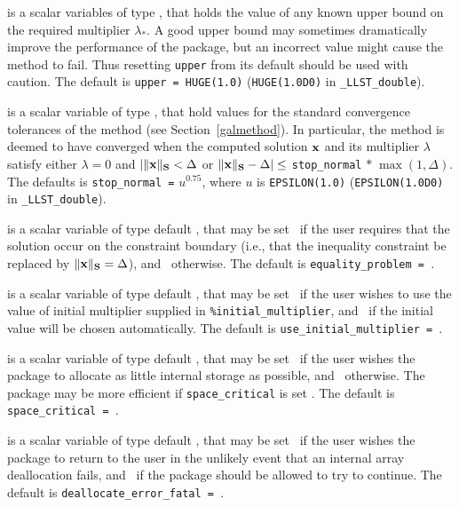 \documentclass{galahad}
\newcommand{\packagename}{LLST}
\newcommand{\fullpackagename}{\libraryname\_\packagename}
\begin{document}
\begin{description}
 is a scalar variables of type \realdp, that holds the value
of any known upper bound on the required multiplier $\lambda_*$. A good upper
bound may sometimes dramatically improve the performance of the package, but
an incorrect value might cause the method to fail. Thus resetting
{\tt upper} from its default should be used with caution. 
The default is {\tt upper = HUGE(1.0)}
({\tt HUGE(1.0D0)} in {\tt \fullpackagename\_double}).

 is a scalar variable of type \realdp, 
that hold values for the standard convergence tolerances of the method
(see Section~\ref{galmethod}). 
In particular, the method is deemed to have converged when the
computed solution ${\mathbf{x}}$ and its multiplier $\lambda$ satisfy either
$\lambda = 0$ and $|\|{\mathbf{x}}\|_{{\mathbf{S}}} < \Delta$ or
$\|{\mathbf{x}}\|_{{\mathbf{S}}} -  \Delta| \leq$ {\tt stop\_normal} $\ast \; 
\max(1,\Delta)$.
The defaults is {\tt stop\_normal =} $u^{0.75}$,
where $u$ is {\tt EPSILON(1.0)} ({\tt EPSILON(1.0D0)} in 
{\tt \fullpackagename\_double}).

 is a scalar variable of type default \logical, that
may be set \true\ if the user requires that the solution 
occur on the constraint boundary (i.e., that the inequality constraint be
replaced by $\|{\mathbf{x}}\|_{{\mathbf{S}}} = \Delta$), and \false\ otherwise. 
The default is {\tt equality\_problem = \false}.
 
 is a scalar variable of type default \logical, 
that may be set \true\ if the user wishes to use the value of initial 
multiplier supplied in {\tt \%initial\_multiplier}, 
and \false\ if the initial value will be chosen automatically.
The default is {\tt use\_initial\_multiplier = \false}.
 
 is a scalar variable of type default \logical, that
may be set \true\ if the user wishes the package to allocate as little
internal storage as possible, and \false\ otherwise. The package may
be more efficient if {\tt space\_critical} is set \false.
The default is {\tt space\_critical = \false}.

 is a scalar variable of type default \logical, 
that may be set \true\ if the user wishes the package to return to the user 
in the unlikely event that an internal array deallocation fails, 
and \false\ if the package should be allowed to try to continue.
The default is {\tt deallocate\_error\_fatal = \false}.


\end{description}
\end{document}
